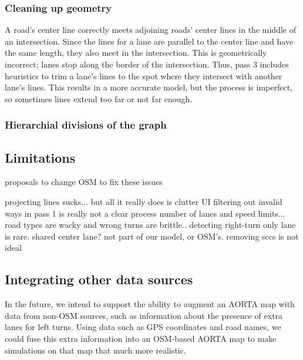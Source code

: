 \documentclass[letterpaper, 10 pt, conference]{ieeeconf}  %
\begin{document}
\subsubsection{Cleaning up geometry}

A road's center line correctly meets adjoining roads' center lines in the middle
of an intersection. Since the lines for a lane are parallel to the center line
and have the same length, they also meet in the intersection. This is
geometrically incorrect; lanes stop along the border of the intersection. Thus,
pass 3 includes heuristics to trim a lane's lines to the spot where they
intersect with another lane's lines. This results in a more accurate model, but
the process is imperfect, so sometimes lines extend too far or not far enough.

\subsubsection{Hierarchial divisions of the graph}


\subsection{Limitations}


proposals to change OSM to fix these issues

projecting lines sucks... but all it really does is clutter UI
filtering out invalid ways in pass 1 is really not a clear process
number of lanes and speed limits... road types are wacky and wrong
turns are brittle.. detecting right-turn only lane is rare. shared center lane?
  not part of our model, or OSM's.
removing sccs is not ideal

\subsection{Integrating other data sources}

In the future, we intend to support the ability to augment an AORTA map with
data from non-OSM sources, such as information about the presence of extra lanes
for left turns. Using data such as GPS coordinates and road names, we could fuse
this extra information into an OSM-based AORTA map to make simulations on that map
that much more realistic.
\end{document}
